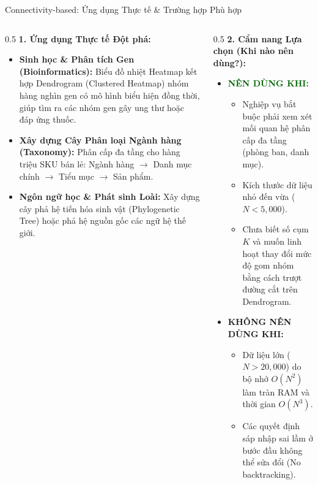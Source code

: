\documentclass[aspectratio=169,10pt]{beamer}
\begin{document}
\begin{frame}{Connectivity-based: Ứng dụng Thực tế \& Trường hợp Phù hợp}
  \footnotesize
  \begin{columns}[T]
    \begin{column}{0.5\textwidth}
      \textbf{1. Ứng dụng Thực tế Đột phá:}
      \begin{itemize}\setlength{\itemsep}{2pt}
        \item \textbf{Sinh học \& Phân tích Gen (Bioinformatics):}
          Biểu đồ nhiệt Heatmap kết hợp Dendrogram (Clustered Heatmap) nhóm hàng nghìn gen có mô hình biểu hiện đồng thời, giúp tìm ra các nhóm gen gây ung thư hoặc đáp ứng thuốc.
        \item \textbf{Xây dựng Cây Phân loại Ngành hàng (Taxonomy):}
          Phân cấp đa tầng cho hàng triệu SKU bán lẻ: Ngành hàng $\to$ Danh mục chính $\to$ Tiểu mục $\to$ Sản phẩm.
        \item \textbf{Ngôn ngữ học \& Phát sinh Loài:}
          Xây dựng cây phả hệ tiến hóa sinh vật (Phylogenetic Tree) hoặc phả hệ nguồn gốc các ngữ hệ thế giới.
      \end{itemize}
    \end{column}
    \begin{column}{0.5\textwidth}
      \textbf{2. Cẩm nang Lựa chọn (Khi nào nên dùng?):}
      \begin{itemize}\setlength{\itemsep}{2pt}
        \item \textcolor{darkgreen}{\textbf{NÊN DÙNG KHI:}}
          \begin{itemize}
            \item Nghiệp vụ bắt buộc phải xem xét mối quan hệ phân cấp đa tầng (phòng ban, danh mục).
            \item Kích thước dữ liệu nhỏ đến vừa ($N < 5{,}000$).
            \item Chưa biết số cụm $K$ và muốn linh hoạt thay đổi mức độ gom nhóm bằng cách trượt đường cắt trên Dendrogram.
          \end{itemize}
        \item \textcolor{crimsonred}{\textbf{KHÔNG NÊN DÙNG KHI:}}
          \begin{itemize}
            \item Dữ liệu lớn ($N > 20{,}000$) do bộ nhớ $O(N^2)$ làm tràn RAM và thời gian $O(N^3)$.
            \item Các quyết định sáp nhập sai lầm ở bước đầu không thể sửa đổi (No backtracking).
          \end{itemize}
      \end{itemize}
    \end{column}
  \end{columns}
\end{frame}
\end{document}
